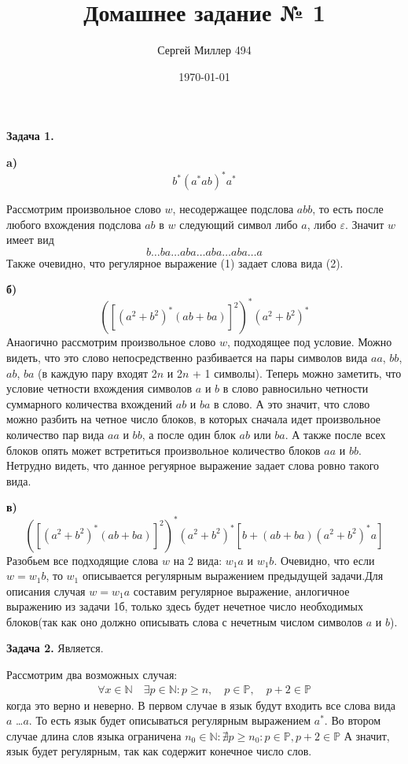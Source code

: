 \documentclass[12pt]{article}
\title{Домашнее задание № 1}
\date{\today}
\author{Сергей Миллер 494}
\begin{document}
 	\maketitle
	\textbf{Задача 1.}
 	
  	\textbf{a)}
  	\begin{equation}
  	 	 b^{*}(a^{*}ab)^{*}a^{*} 	
   	\end{equation}

  	Рассмотрим произвольное слово $w$, несодержащее подслова $abb$, то есть после любого вхождения подслова $ab$ в $w$ следующий 			символ либо $a$, либо $\varepsilon$. Значит $w$ имеет вид 
  	\begin{equation}
  	 	 b \dots b a \dots aba \dots aba \dots aba \dots a 
   	\end{equation}
  	Также очевидно, что регулярное выражение (1) задает слова вида (2).
    	
  	\textbf{б)}
  	\begin{equation}
  		([(a^2 + b^2)^{*}(ab+ba)]^2)^{*}(a^2 + b^2)^{*}
  	\end{equation}
  	Анаогично рассмотрим произвольное слово $w$, подходящее под условие. Можно видеть, что это слово непосредственно разбивается на пары символов вида $aa$, $bb$, $ab$, $ba$ (в каждую пару входят 2$n$ и 2$n$ + 1 символы). Теперь можно заметить, что условие четности вхождения символов $a$ и $b$ в слово равносильно четности суммарного количества вхождений $ab$ и $ba$ в слово. А это значит, что слово можно разбить на четное число блоков, в которых сначала идет произвольное количество пар вида $aa$ и $bb$, а после один блок $ab$ или $ba$. А также после всех блоков опять может встретиться произвольное количество блоков $aa$ и $bb$. Нетрудно видеть, что данное регуярное выражение задает слова ровно такого вида.
  	
  	\textbf{в)}
  	\begin{equation}
  		([(a^2 + b^2)^{*}(ab+ba)]^2)^{*}(a^2 + b^2)^{*}[b + (ab+ba)(a^2 + b^2)^{*}a]
  	\end{equation}
  	Разобьем все подходящие слова $w$ на 2 вида: $w_1a$ и $w_1b$. Очевидно, что если $w = w_1b$, то $w_1$ описывается регулярным выражением предыдущей задачи.Для описания случая $w = w_1a$ составим регулярное выражение, анлогичное выражению из задачи 1б, только здесь будет нечетное число необходимых блоков(так как оно должно описывать слова с нечетным числом символов $a$ и $b$).

  \textbf{Задача 2.}
    Является.

    Рассмотрим два возможных случая: 
    \begin{eqnarray}
      \forall x \in \mathbb{N} \quad \exists p \in \mathbb{N}:  p \geq n, \quad p \in \mathbb{P}, \quad p+2 \in \mathbb{P}
    \end{eqnarray} 
    когда это верно и неверно. В первом случае в язык будут входить все слова вида $a$ \dots $a$. То есть язык будет описываться регулярным выражением $a^{*}$. Во втором случае длина слов языка ограничена $n_0 \in \mathbb{N}: \nexists p \geq n_0:  p \in \mathbb{P}, p+2 \in \mathbb{P}$
    А значит, язык будет регулярным, так как содержит конечное число слов.
\end{document}
